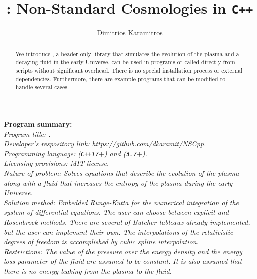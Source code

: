 \documentclass[11pt,a4paper]{article}
\author[ ]{Dimitrios Karamitros}
\affil[ ]{\em Department of Physics and Astronomy, The University of Manchester,}
\affil[ ]{\em Manchester M13 9PL, United Kingdom}
\affil[ ]{}
\affil[ ]{\textit{E-mail: } \href{mailto:dimitrios.karamitros@manchester.ac.uk}{\color{blue}{dimitrios.karamitros@manchester.ac.uk}}}
\title{\nsc: Non-Standard Cosmologies in {\tt C++}}
\begin{document}
\maketitle


\begin{abstract}
We introduce \nsc, a header-only \CPP library that simulates the evolution of the plasma and a decaying fluid in the early Universe.
%
\nsc can be used in \CPP programs or called directly from \PY scripts without significant overhead.
%
There is no special installation process or external dependencies. Furthermore, there are example programs that can be modified to handle several cases. 
\end{abstract}

\noindent
{\bf Program summary:}\\

{\sl 
	Program title: \nsc.\\
	
	Developer's respository link: \href{https://github.com/dkaramit/NSCpp}{https://github.com/dkaramit/NSCpp}.\\
	
	Programming language: \CPP ({\tt C++17}$+$) and \PY ({\tt 3.7}$+$).\\
	
	Licensing provisions: MIT license.\\
	
	Nature of problem: Solves equations that describe the evolution of the plasma along with a fluid that increases the entropy of the plasma during the early Universe.\\
	
	Solution method: Embedded Runge-Kutta for the numerical integration of the system of differential equations. The user can choose between explicit and Rosenbrock methods. There are several of Butcher tableaux already implemented, but the user can implement their own. The interpolations of the relativistic degrees of freedom is accomplished by cubic spline interpolation.\\ 
	
	Restrictions: The value of the pressure over the energy density and the energy loss parameter of the fluid are assumed to be constant. It is also assumed that there is no energy leaking from the plasma to the fluid.
}

\tableofcontents
\end{document}
